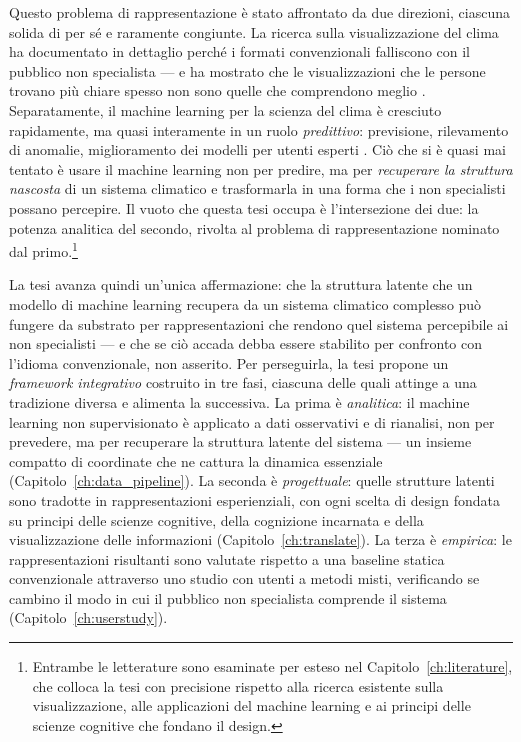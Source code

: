 Questo problema di rappresentazione è stato affrontato da due direzioni, ciascuna solida di per sé e raramente congiunte. La ricerca sulla visualizzazione del clima ha documentato in dettaglio perché i formati convenzionali falliscono con il pubblico non specialista --- e ha mostrato che le visualizzazioni che le persone trovano più chiare spesso non sono quelle che comprendono meglio \parencite{harold2016, hegarty2012}. Separatamente, il machine learning per la scienza del clima è cresciuto rapidamente, ma quasi interamente in un ruolo \emph{predittivo}: previsione, rilevamento di anomalie, miglioramento dei modelli per utenti esperti \citep{reichstein2019, sonnewald2021}. Ciò che si è quasi mai tentato è usare il machine learning non per predire, ma per \emph{recuperare la struttura nascosta} di un sistema climatico e trasformarla in una forma che i non specialisti possano percepire. Il vuoto che questa tesi occupa è l'intersezione dei due: la potenza analitica del secondo, rivolta al problema di rappresentazione nominato dal primo.\footnote{Entrambe le letterature sono esaminate per esteso nel Capitolo~\ref{ch:literature}, che colloca la tesi con precisione rispetto alla ricerca esistente sulla visualizzazione, alle applicazioni del machine learning e ai principi delle scienze cognitive che fondano il design.}

La tesi avanza quindi un'unica affermazione: che la struttura latente che un modello di machine learning recupera da un sistema climatico complesso può fungere da substrato per rappresentazioni che rendono quel sistema percepibile ai non specialisti --- e che se ciò accada debba essere stabilito per confronto con l'idioma convenzionale, non asserito. Per perseguirla, la tesi propone un \emph{framework integrativo} costruito in tre fasi, ciascuna delle quali attinge a una tradizione diversa e alimenta la successiva. La prima è \emph{analitica}: il machine learning non supervisionato è applicato a dati osservativi e di rianalisi, non per prevedere, ma per recuperare la struttura latente del sistema --- un insieme compatto di coordinate che ne cattura la dinamica essenziale (Capitolo~\ref{ch:data_pipeline}). La seconda è \emph{progettuale}: quelle strutture latenti sono tradotte in rappresentazioni esperienziali, con ogni scelta di design fondata su principi delle scienze cognitive, della cognizione incarnata e della visualizzazione delle informazioni (Capitolo~\ref{ch:translate}). La terza è \emph{empirica}: le rappresentazioni risultanti sono valutate rispetto a una baseline statica convenzionale attraverso uno studio con utenti a metodi misti, verificando se cambino il modo in cui il pubblico non specialista comprende il sistema (Capitolo~\ref{ch:userstudy}).
